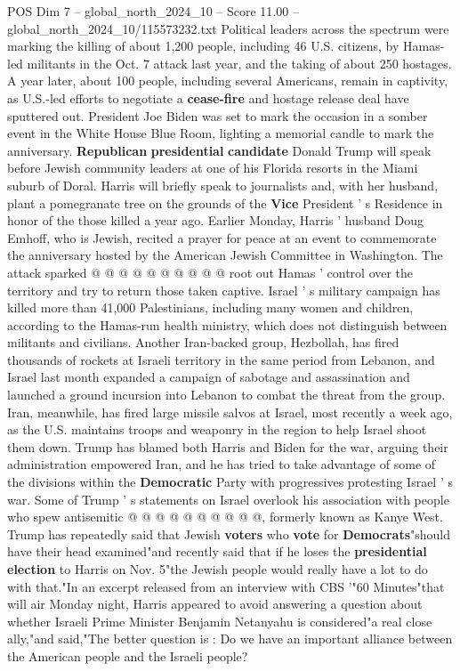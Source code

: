 \begin{textsample}{POS Dim 7 – global\_north\_2024\_10 – Score 11.00 – global\_north\_2024\_10/115573232.txt}  \label{ex:f7_pos_098}
Political leaders across the spectrum were marking the killing of about 1,200 people, including 46 U.S. citizens, by Hamas-led militants in the Oct. 7 attack last year, and the taking of about 250 hostages.
A year later, about 100 people, including several Americans, remain in captivity, as U.S.-led efforts to negotiate a \textbf{cease-fire} and hostage release deal have sputtered out.
President Joe Biden was set to mark the occasion in a somber event in the White House Blue Room, lighting a memorial candle to mark the anniversary. \textbf{Republican} \textbf{presidential} \textbf{candidate} Donald Trump will speak before Jewish community leaders at one of his Florida resorts in the Miami suburb of Doral.
Harris will briefly speak to journalists and, with her husband, plant a pomegranate tree on the grounds of the \textbf{Vice} President ' s Residence in honor of the those killed a year ago.
Earlier Monday, Harris ' husband Doug Emhoff, who is Jewish, recited a prayer for peace at an event to commemorate the anniversary hosted by the American Jewish Committee in Washington.
The attack sparked @ @ @ @ @ @ @ @ @ @ root out Hamas ' control over the territory and try to return those taken captive.
Israel ' s military campaign has killed more than 41,000 Palestinians, including many women and children, according to the Hamas-run health ministry, which does not distinguish between militants and civilians.
Another Iran-backed group, Hezbollah, has fired thousands of rockets at Israeli territory in the same period from Lebanon, and Israel last month expanded a campaign of sabotage and assassination and launched a ground incursion into Lebanon to combat the threat from the group.
Iran, meanwhile, has fired large missile salvos at Israel, most recently a week ago, as the U.S. maintains troops and weaponry in the region to help Israel shoot them down.
Trump has blamed both Harris and Biden for the war, arguing their administration empowered Iran, and he has tried to take advantage of some of the divisions within the \textbf{Democratic} Party with progressives protesting Israel ' s war.
Some of Trump ' s statements on Israel overlook his association with people who spew antisemitic @ @ @ @ @ @ @ @ @ @, formerly known as Kanye West.
Trump has repeatedly said that Jewish \textbf{voters} who \textbf{vote} for \textbf{Democrats}"should have their head examined"and recently said that if he loses the \textbf{presidential} \textbf{election} to Harris on Nov. 5"the Jewish people would really have a lot to do with that."In an excerpt released from an interview with CBS '"60 Minutes"that will air Monday night, Harris appeared to avoid answering a question about whether Israeli Prime Minister Benjamin Netanyahu is considered"a real close ally,"and said,"The better question is : Do we have an important alliance between the American people and the Israeli people?

\end{textsample}
